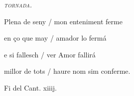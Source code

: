 \documentclass[12pt]{article}
\begin{document}
\begin{estrofaExtra}%




\begin{tornada}

\pagina{[15v]} \textit{\textsc{tornada.}}

\end{tornada}


\end{estrofaExtra}


\begin{estrofa}

 Plena de seny / mon enteniment ferme

 en \c{c}o que may / amador lo ferm\'{a}

 e si fallesch / ver Amor fallir\'{a}

 millor de tots / haure nom sim conferme.

\end{estrofa}



\begin{estrofaExtra}%

\begin{final}

Fi del Cant. xiiij.

\end{final}

\end{estrofaExtra}
\end{document}
